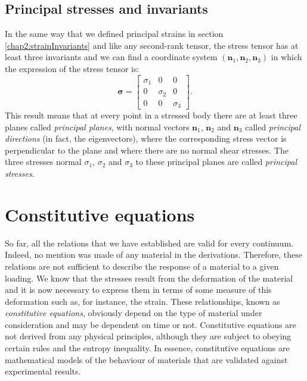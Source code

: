	
		\subsection{Principal stresses and invariants}
In the same way that we defined principal strains in section \ref{chap2:strainInvariants} and like any second-rank tensor, the stress tensor has at least three invariants and we can find a coordinate system $(\mathbf{n}_1, \mathbf{n}_2, \mathbf{n}_3)$ in which the expression of the stress tensor is:
\begin{equation}
\boldsymbol \sigma =
	\begin{bmatrix}
	\sigma_1 &         0      &        0       \\
	        0      & \sigma_2 &        0       \\
	        0      &          0     & \sigma_3
	\end{bmatrix}	
	.
\end{equation}
This result means that at every point in a stressed body there are at least three planes called \emph{principal planes}, with normal vectors $\mathbf{n}_1$, $\mathbf{n}_2$ and $\mathbf{n}_3$ called \emph{principal directions} (in fact, the eigenvectors), where the corresponding stress vector is perpendicular to the plane and where there are no normal shear stresses. The three stresses normal $\sigma_1$, $\sigma_2$ and $\sigma_3$ to these principal planes are called \emph{principal stresses}.


\section{Constitutive equations}
So far, all the relations that we have established are valid for every continuum. Indeed, no mention was made of any material in the derivations. Therefore, these relations are not sufficient to describe the response of a material to a given loading. We know that the stresses result from the deformation of the material and it is now necessary to express them in terms of some measure of this deformation such as, for instance, the strain. These relationships, known as \emph{constitutive equations}, obviously depend on the type of material under consideration and may be dependent on time or not. Constitutive equations are not derived from any physical principles, although they are subject to obeying certain rules and the entropy inequality. In essence, constitutive equations are mathematical models of the behaviour of materials that are validated against experimental results. 


